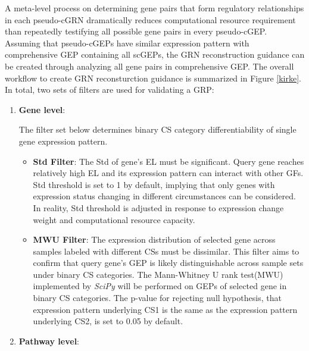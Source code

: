 \documentclass[fleqn,10pt]{wlscirep}
\begin{document}
A meta-level process on determining gene pairs that form regulatory relationships in each pseudo-cGRN dramatically reduces computational resource requirement than repeatedly testifying all possible gene pairs in every pseudo-cGEP.
Assuming that pseudo-cGEPs have similar expression pattern with comprehensive GEP containing all scGEPs, the GRN reconstruction guidance can be created through analyzing all gene pairs in comprehensive GEP.
The overall workflow to create GRN reconsturction guidance is summarized in Figure \ref{kirke}.
In total, two sets of filters are used for validating a GRP:
\begin{enumerate}
\setlength\itemsep{0em}
\item {\textbf{Gene level}}:

The filter set below determines binary CS category differentiability of single gene expression pattern. 
\begin{itemize}
\setlength\itemsep{0em}
\item \textbf{Std Filter}: 
The Std of gene’s EL must be significant. Query gene reaches relatively high EL and its expression pattern can interact with other GFs. Std threshold is set to 1 by default, implying that only genes with expression status changing in different circumstances can be considered. In reality, Std threshold is adjusted in response to expression change weight and computational resource capacity. 

\item \textbf{MWU Filter}: The expression distribution of selected gene across samples labeled with different CSs must be dissimilar.
This filter aims to confirm that query gene's GEP is likely distinguishable across sample sets under binary CS categories.
The Mann-Whitney U rank test(MWU) implemented by \emph{SciPy}\cite{2020SciPy-NMeth} will be performed on GEPs of selected gene in binary CS categories.
The p-value for rejecting null hypothesis, that expression pattern underlying CS1 is the same as the expression pattern underlying CS2, is set to 0.05 by default.
\end{itemize}

\item {\textbf{Pathway level}}:


\end{enumerate}
\end{document}

